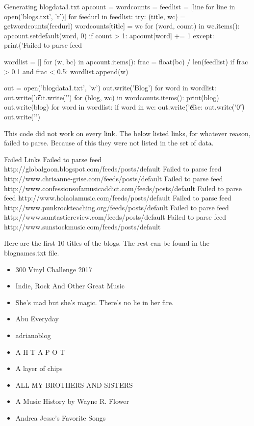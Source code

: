 \documentclass[11pt]{report}
\begin{document}
\begin{mylisting}{Generating blogdata1.txt}
apcount = {}
wordcounts = {}
feedlist = [line for line in open('blogs.txt', 'r')]
for feedurl in feedlist:
    try:
        (title, wc) = getwordcounts(feedurl)
        wordcounts[title] = wc
        for (word, count) in wc.items():
            apcount.setdefault(word, 0)
            if count > 1:
                apcount[word] += 1
    except:
        print('Failed to parse feed %

wordlist = []
for (w, bc) in apcount.items():
    frac = float(bc) / len(feedlist)
    if frac > 0.1 and frac < 0.5:
        wordlist.append(w)

out = open('blogdata1.txt', 'w')
out.write('Blog')
for word in wordlist:
    out.write('\t%
out.write('\n')
for (blog, wc) in wordcounts.items():
    print(blog)
    out.write(blog)
    for word in wordlist:
        if word in wc: 
            out.write('\t%
        else:
            out.write('\t0')
    out.write('\n')

\end{mylisting}
 This code did not work on every link. The below listed links, for whatever reason, failed to parse. Because of this they were not listed in the set of data.
\begin{mylisting}{Failed Links}
Failed to parse feed http://globalgoon.blogspot.com/feeds/posts/default
Failed to parse feed http://www.chrisanne-grise.com/feeds/posts/default
Failed to parse feed http://www.confessionsofamusicaddict.com/feeds/posts/default
Failed to parse feed http://www.holaolamusic.com/feeds/posts/default
Failed to parse feed http://www.punkrockteaching.org/feeds/posts/default
Failed to parse feed http://www.samtasticreview.com/feeds/posts/default
Failed to parse feed http://www.sunstockmusic.com/feeds/posts/default
\end{mylisting}
Here are the first 10 titles of the blogs. The rest can be found in the blognames.txt file.

\pagebreak
\begin{itemize}
\item 300 Vinyl Challenge 2017
\item Indie, Rock And Other Great Music
\item She's mad but she's magic. There's no lie in her fire.
\item Abu Everyday
\item adrianoblog
\item A H T A P O T
\item A layer of chips
\item ALL MY BROTHERS AND SISTERS
\item A Music History by Wayne R. Flower
\item Andrea Jesse's Favorite Songs
\end{itemize}
\pagebreak
\end{document}
